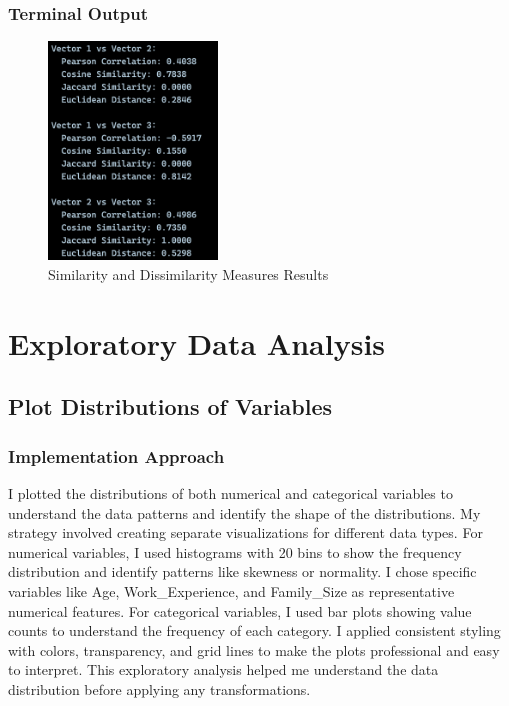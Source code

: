 \documentclass[12pt,a4paper]{article}
\begin{document}
\subsubsection{Terminal Output}

\begin{figure}[h!]
\centering
    \includegraphics[width=0.4\textwidth]{Figures/similarity_output.png}
    \caption{Similarity and Dissimilarity Measures Results}
\end{figure}


\newpage
\section{Exploratory Data Analysis}

\subsection{Plot Distributions of Variables}

\subsubsection{Implementation Approach}
I plotted the distributions of both numerical and categorical variables to understand the data patterns and identify the shape of the distributions. My strategy involved creating separate visualizations for different data types. For numerical variables, I used histograms with 20 bins to show the frequency distribution and identify patterns like skewness or normality. I chose specific variables like Age, Work\_Experience, and Family\_Size as representative numerical features. For categorical variables, I used bar plots showing value counts to understand the frequency of each category. I applied consistent styling with colors, transparency, and grid lines to make the plots professional and easy to interpret. This exploratory analysis helped me understand the data distribution before applying any transformations.
\end{document}
